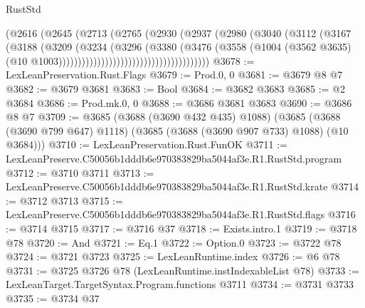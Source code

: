 \begin{lexlean}{RustStd}
\begin{coremodule}
                                            (@2616
                                              (@2645
                                                (@2713
                                                  (@2765
                                                    (@2930
                                                      (@2937
                                                        (@2980
                                                          (@3040
                                                            (@3112
                                                              (@3167
                                                                (@3188
                                                                  (@3209
                                                                    (@3234
                                                                      (@3296
                                                                        (@3380
                                                                          (@3476
                                                                            (@3558
                                                                              (@1004
                                                                                (@3562 @3635)
                                                                                (@10
                                                                                  @1003)))))))))))))))))))))))))))))))))))))))
@3678 := LexLeanPreservation.Rust.Flags
@3679 := Prod.{0, 0}
@3681 := @3679 @8 @7
@3682 := @3679 @3681
@3683 := Bool
@3684 := @3682 @3683
@3685 := @2 @3684
@3686 := Prod.mk.{0, 0}
@3688 := @3686 @3681 @3683
@3690 := @3686 @8 @7
@3709 := @3685
    (@3688 (@3690 @432 @435) @1088)
    (@3685 (@3688 (@3690 @799 @647) @1118) (@3685 (@3688 (@3690 @907 @733) @1088) (@10 @3684)))
@3710 := LexLeanPreservation.Rust.FunOK
@3711 := LexLeanPreserve.C50056b1dddb6e970383829ba5044af3e.R1.RustStd.program
@3712 := @3710 @3711
@3713 := LexLeanPreserve.C50056b1dddb6e970383829ba5044af3e.R1.RustStd.krate
@3714 := @3712 @3713
@3715 := LexLeanPreserve.C50056b1dddb6e970383829ba5044af3e.R1.RustStd.flags
@3716 := @3714 @3715
@3717 := @3716 @37
@3718 := Exists.intro.{1}
@3719 := @3718 @78
@3720 := And
@3721 := Eq.{1}
@3722 := Option.{0}
@3723 := @3722 @78
@3724 := @3721 @3723
@3725 := LexLeanRuntime.index
@3726 := @6 @78
@3731 := @3725 @3726 @78 (LexLeanRuntime.instIndexableList @78)
@3733 := LexLeanTarget.TargetSyntax.Program.functions @3711
@3734 := @3731 @3733
@3735 := @3734 @37

\end{coremodule}
\end{lexlean}
